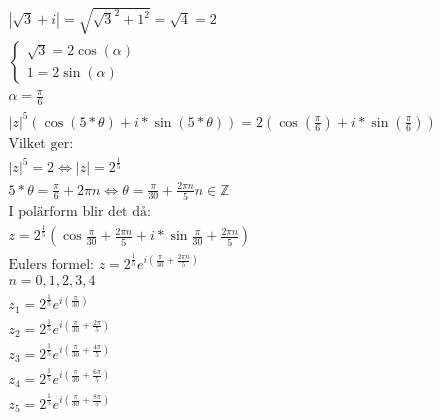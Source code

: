 \begin{align*}
  &\quad |\sqrt{3} + i| = \sqrt{\sqrt{3}^2 + 1^2} = \sqrt{4} = 2 \\
  &\quad \left\{ \begin{array} { l } { \sqrt{3} = 2 \cos(\alpha)} \\ { 1 = 2 \sin(\alpha) } \end{array} \right. \\
  &\quad \alpha = \frac{\pi}{6} \\
  &\quad |z|^5(\cos{(5*\theta)} + i * \sin{(5*\theta)}) = 2(\cos{(\frac{\pi}{6})} + i * \sin{(\frac{\pi}{6})}) \\
  &\quad \text{Vilket ger: } \\
  &\quad |z|^5 = 2 \Leftrightarrow |z| = 2^{\frac{1}{5}} \\
  &\quad 5*\theta = \frac{\pi}{6} + 2 \pi n \Leftrightarrow \theta = \frac{\pi}{30} + \frac{2 \pi n}{5} n \in \mathbb{Z} \\
  &\quad \text{I polärform blir det då: } \\
  &\quad z = 2^{\frac{1}{5}} (\cos{\frac{\pi}{30} + \frac{2 \pi n}{5}} + i * \sin{\frac{\pi}{30} + \frac{2 \pi n}{5}}) \\
  &\quad \text{Eulers formel: } z = 2^{\frac{1}{5}} e^{i (\frac{\pi}{30} + \frac{2 \pi n}{5})} \\
  &\quad n = 0,1,2,3,4 \\
  &\quad z_1 = 2^{\frac{1}{5}} e^{i (\frac{\pi}{30})} \\
  &\quad z_2 = 2^{\frac{1}{5}} e^{i (\frac{\pi}{30} + \frac{2 \pi}{5})} \\
  &\quad z_3 = 2^{\frac{1}{5}} e^{i (\frac{\pi}{30} + \frac{4 \pi}{5})} \\
  &\quad z_4 = 2^{\frac{1}{5}} e^{i (\frac{\pi}{30} + \frac{6 \pi}{5})} \\
  &\quad z_5 = 2^{\frac{1}{5}} e^{i (\frac{\pi}{30} + \frac{8 \pi}{5})} \\
\end{align*}



